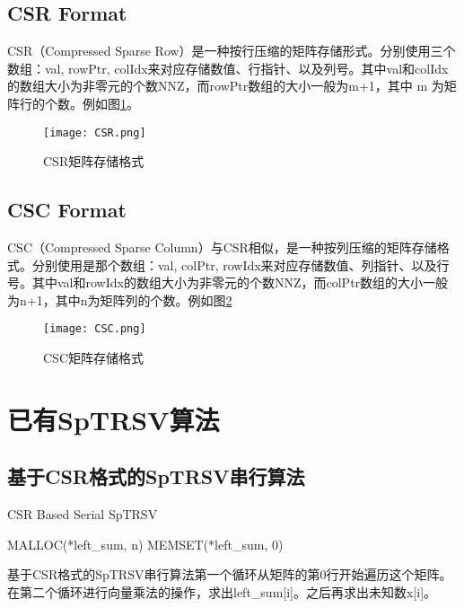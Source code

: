 \subsection{CSR Format}

CSR（Compressed Sparse Row）是一种按行压缩的矩阵存储形式。分别使用三个数组：val, rowPtr, colIdx来对应存储数值、行指针、以及列号。其中val和colIdx的数组大小为非零元的个数NNZ，而rowPtr数组的大小一般为m+1，其中 m 为矩阵行的个数。例如图\ref{CSR}。

\begin{figure}[htbp]
    \centering
    \texttt{[image: CSR.png]}
    \caption{CSR矩阵存储格式}
    \label{CSR}
\end{figure}

\subsection{CSC Format}

CSC（Compressed Sparse Column）与CSR相似，是一种按列压缩的矩阵存储格式。分别使用是那个数组：val, colPtr, rowIdx来对应存储数值、列指针、以及行号。其中val和rowIdx的数组大小为非零元的个数NNZ，而colPtr数组的大小一般为n+1，其中n为矩阵列的个数。例如图\ref{CSC}

\begin{figure}[htbp]
    \centering
    \texttt{[image: CSC.png]}
    \caption{CSC矩阵存储格式}
    \label{CSC}
\end{figure}

\section{已有SpTRSV算法}

\subsection{基于CSR格式的SpTRSV串行算法}

\begin{algorithm}[H]
    \caption{CSR Based Serial SpTRSV}\label{csr-serial-sptrsv}
    MALLOC(*left\_sum, n) \;
    MEMSET(*left\_sum, 0) \;
\end{algorithm}

基于CSR格式的SpTRSV串行算法第一个循环从矩阵的第0行开始遍历这个矩阵。在第二个循环进行向量乘法的操作，求出left\_sum[i]。之后再求出未知数x[i]。

